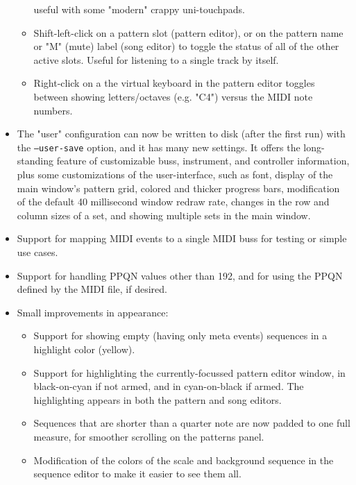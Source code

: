 \documentclass[
 11pt,
 twoside,
 a4paper,
 headinclude,
 footinclude,
 final                                 %
]{article}
\begin{document}
\begin{itemize}
\begin{itemize}
            useful with some "modern" crappy uni-touchpads.
         \item Shift-left-click on a pattern slot (pattern editor),
            or on the pattern name or "M" (mute) label (song editor)
            to toggle the status of all of the other active slots.
            Useful for listening to a single track by itself.
         \item Right-click on a the virtual keyboard in the pattern editor
            toggles between showing letters/octaves (e.g. "C4") versus
            the MIDI note numbers.  
      \end{itemize}
      \item The "user" configuration can now be written to disk (after the
         first run) with the \texttt{--user-save} option, and 
         it has many new settings.  It offers the
         long-standing feature of customizable buss, instrument, and controller
         information, plus some customizations of the user-interface, such as
         font, display of the main window's pattern grid, colored and thicker
         progress bars, modification of the default 40 millisecond window
         redraw rate, changes in the row and column sizes of a set, and showing
         multiple sets in the main window.
      \item Support for mapping MIDI events to a single MIDI buss for testing
         or simple use cases.
      \item Support for handling PPQN values other than 192, and for using
         the PPQN defined by the MIDI file, if desired.
      \item Small improvements in appearance:
      \begin{itemize}
         \item Support for showing empty (having only meta
            events) sequences in a highlight color (yellow).
         \item Support for highlighting the currently-focussed pattern editor
            window, in black-on-cyan if not armed, and in cyan-on-black if
            armed.  The highlighting appears in both the pattern and song
            editors.
         \item Sequences that are shorter than a quarter note are now padded to
            one full measure, for smoother scrolling on the patterns panel.
         \item Modification of the colors of the scale and background sequence
            in the sequence editor to make it easier to see them all.

\end{itemize}
\end{itemize}
\end{document}
